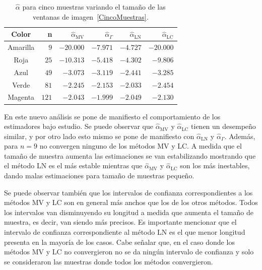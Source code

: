 \begin{table}[H]
	\centering
	\caption{\label{TablaCincoMuestras}$\widehat{\alpha}$ para cinco muestras variando el tamaño de las ventanas de imagen~\ref{CincoMuestras}.}
	\begin{tabular}{c*5{r}}
		\toprule
		Color       &  n    &  $\widehat{\alpha}_{\text{MV}}$    &  $\widehat{\alpha}_{\Gamma}$  &  $\widehat{\alpha}_{\text{LN}}$ &  $\widehat{\alpha}_{\text{LC}}$\\
		\midrule
		Amarilla    & $9$     & $-20.000$      & $-7.971$ & $-4.727$ & $-20.000$\\
		Roja        & $25$    & $-10.313$  & $-5.418$ & $-4.302$ & $-9.806$\\
		Azul        & $49$    & $-3.073$   & $-3.119$ & $-2.441$ & $-3.285$\\
		Verde       & $81$    & $-2.245$   & $-2.153$ & $-2.033$ & $-2.454$\\
		Magenta     & $121$   & $-2.043$   & $-1.999$ & $-2.049$ & $-2.130$\\
		\bottomrule
	\end{tabular}
\end{table}

En este nuevo análisis se pone de manifiesto el comportamiento de los estimadores bajo estudio. Se puede observar que $\widehat{\alpha}_{\text{MV}}$ y $\widehat{\alpha}_{\text{LC}}$ tienen un desempeño similar, y por otro lado esto mismo se pone de manifiesto con $\widehat{\alpha}_{\text{LN}}$ y $\widehat{\alpha}_{\Gamma}$. Además, para $n=9$ no convergen ninguno de los métodos MV y LC. A medida que el tamaño de muestra aumenta las estimaciones se van estabilizando mostrando que el método LN es el más estable mientras que $\widehat{\alpha}_{\text{MV}}$ y $\widehat{\alpha}_{\text{LC}}$ son los más inestables, dando malas estimaciones para tamaño de muestras pequeño. 

Se puede observar también que los intervalos de confianza correspondientes a los métodos MV y LC son en general más anchos que los de los otros métodos. Todos los intervalos van disminuyendo su longitud a medida que aumenta el tamaño de muestra, es decir, van siendo más precisos. Es importante mencionar que el intervalo de confianza correspondiente al método LN es el que menor longitud presenta en la mayoría de los casos. Cabe señalar que, en el caso donde los métodos MV y LC no convergieron no se da ningún intervalo de confianza y solo se consideraron las muestras donde todos los métodos convergieron.


